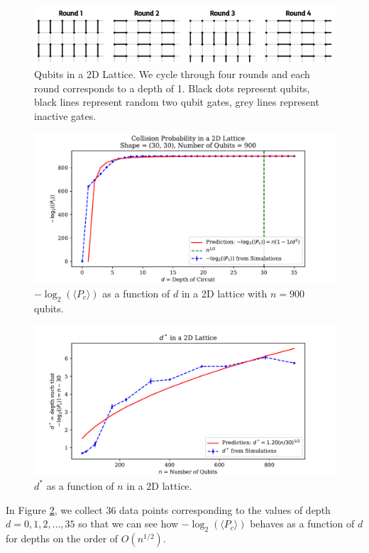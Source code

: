 \documentclass[11pt]{article}
\theoremstyle{definition}
\theoremstyle{plain}
\begin{document}
\begin{figure}[!htb]
\centering
\includegraphics[width=.9\textwidth]{figures/2D/2D_circuit.pdf}
\caption{Qubits in a 2D Lattice. We cycle through four rounds and each round corresponds to a depth of 1. Black dots represent qubits, black lines represent random two qubit gates, grey lines represent inactive gates.}
\label{fig_2d}
\end{figure}
\begin{figure}[!htb]
\centering
\includegraphics[width=.8\textwidth]{figures/2D/cp_mean_log.pdf}
\caption{$-\log_2(\langle P_c \rangle)$ as a function of $d$ in a 2D lattice with $n = 900$ qubits.}
\label{k_2d}
\end{figure}
\begin{figure}[!htb]
\centering
\includegraphics[width=.8\textwidth]{figures/2D/x_star_30.pdf}
\caption{$d^*$ as a function of $n$ in a 2D lattice.}
\label{d_star_2d} 
\end{figure}  

In Figure {\ref{k_2d}}, we collect $36$ data points corresponding to the values of depth $d = 0, 1, 2, \ldots, 35$ so that we can see how $-\log_2(\langle P_c \rangle)$ behaves as a function of $d$ for depths on the order of $O(n^{1/2})$.  
\end{document}
